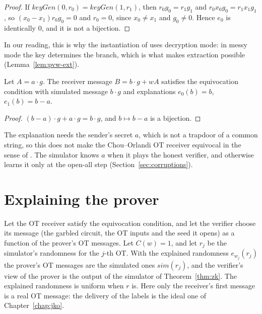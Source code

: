 \begin{proof}
  \leanok
  If $\mathit{keyGen}(0, r_0) = \mathit{keyGen}(1, r_1)$, then $r_0 g_0 = r_1 g_1$ and
  $r_0 x_0 g_0 = r_1 x_1 g_1$, so $(x_0 - x_1) r_0 g_0 = 0$ and $r_0 = 0$, since $x_0 \neq x_1$
  and $g_0 \neq 0$. Hence $e_0$ is identically $0$, and it is not a bijection.
\end{proof}

In our reading, this is why the instantiation of \cite[Sect.~3.3]{GKPS18} uses decryption mode: in
messy mode the key determines the branch, which is what makes extraction possible
(Lemma~\ref{lem:pvw-ext}).

\begin{proposition}
  \label{prop:co-re}
  \leanok
  Let $A = a \cdot g$. The receiver message $B = b \cdot g + wA$ satisfies the equivocation
  condition with simulated message $b \cdot g$ and explanations $e_0(b) = b$, $e_1(b) = b - a$.
\end{proposition}

\begin{proof}
  \leanok
  $(b - a) \cdot g + a \cdot g = b \cdot g$, and $b \mapsto b - a$ is a bijection.
\end{proof}

The explanation needs the sender's secret $a$, which is not a trapdoor of a common string, so this
does not make the Chou--Orlandi OT receiver equivocal in the sense of \cite[Definition~3.1]{GKPS18}.
The simulator knows $a$ when it plays the honest verifier, and otherwise learns it only at the
open-all step (Section~\ref{sec:corruptions}).

\section{Explaining the prover}

\begin{theorem}
  \label{thm:explain-prover}
  \leanok
  Let the OT receiver satisfy the equivocation condition, and let the verifier choose its message (the garbled
  circuit, the OT inputs and the seed it opens) as a function of the prover's OT messages. Let
  $C(w) = 1$, and let $r_j$ be the simulator's randomness for the $j$-th OT. With the explained
  randomness $e_{w_j}(r_j)$ the prover's OT messages are the simulated ones $\mathit{sim}(r_j)$,
  and the verifier's view of the prover is the output of the simulator of Theorem~\ref{thm:zk}.
  The explained randomness is uniform when $r$ is. Here only the receiver's first message is a real
  OT message: the delivery of the labels is the ideal one of Chapter~\ref{chap:jko}.
\end{theorem}

